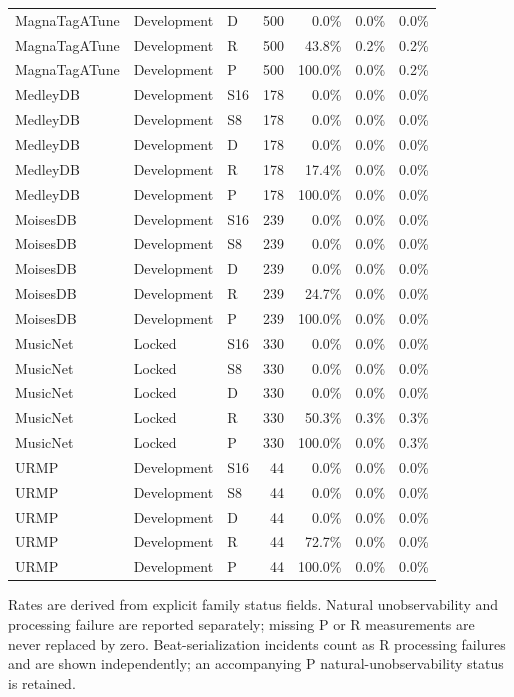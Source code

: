\begin{longtable}{lllrrrr}
MagnaTagATune & Development & D & 500 & 0.0\% & 0.0\% & 0.0\% \\
MagnaTagATune & Development & R & 500 & 43.8\% & 0.2\% & 0.2\% \\
MagnaTagATune & Development & P & 500 & 100.0\% & 0.0\% & 0.2\% \\
MedleyDB & Development & S16 & 178 & 0.0\% & 0.0\% & 0.0\% \\
MedleyDB & Development & S8 & 178 & 0.0\% & 0.0\% & 0.0\% \\
MedleyDB & Development & D & 178 & 0.0\% & 0.0\% & 0.0\% \\
MedleyDB & Development & R & 178 & 17.4\% & 0.0\% & 0.0\% \\
MedleyDB & Development & P & 178 & 100.0\% & 0.0\% & 0.0\% \\
MoisesDB & Development & S16 & 239 & 0.0\% & 0.0\% & 0.0\% \\
MoisesDB & Development & S8 & 239 & 0.0\% & 0.0\% & 0.0\% \\
MoisesDB & Development & D & 239 & 0.0\% & 0.0\% & 0.0\% \\
MoisesDB & Development & R & 239 & 24.7\% & 0.0\% & 0.0\% \\
MoisesDB & Development & P & 239 & 100.0\% & 0.0\% & 0.0\% \\
MusicNet & Locked & S16 & 330 & 0.0\% & 0.0\% & 0.0\% \\
MusicNet & Locked & S8 & 330 & 0.0\% & 0.0\% & 0.0\% \\
MusicNet & Locked & D & 330 & 0.0\% & 0.0\% & 0.0\% \\
MusicNet & Locked & R & 330 & 50.3\% & 0.3\% & 0.3\% \\
MusicNet & Locked & P & 330 & 100.0\% & 0.0\% & 0.3\% \\
URMP & Development & S16 & 44 & 0.0\% & 0.0\% & 0.0\% \\
URMP & Development & S8 & 44 & 0.0\% & 0.0\% & 0.0\% \\
URMP & Development & D & 44 & 0.0\% & 0.0\% & 0.0\% \\
URMP & Development & R & 44 & 72.7\% & 0.0\% & 0.0\% \\
URMP & Development & P & 44 & 100.0\% & 0.0\% & 0.0\% \\
\bottomrule
\end{longtable}
{\footnotesize Rates are derived from explicit family status fields. Natural unobservability and processing failure are reported separately; missing P or R measurements are never replaced by zero. Beat-serialization incidents count as R processing failures and are shown independently; an accompanying P natural-unobservability status is retained.}
